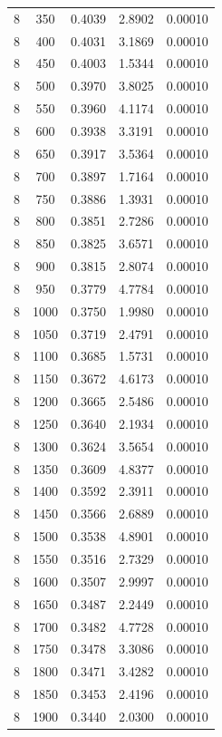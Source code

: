 \begin{longtable}{ccccc}
    8 & 350 & 0.4039 & 2.8902 & 0.00010 \\
    8 & 400 & 0.4031 & 3.1869 & 0.00010 \\
    8 & 450 & 0.4003 & 1.5344 & 0.00010 \\
    8 & 500 & 0.3970 & 3.8025 & 0.00010 \\
    8 & 550 & 0.3960 & 4.1174 & 0.00010 \\
    8 & 600 & 0.3938 & 3.3191 & 0.00010 \\
    8 & 650 & 0.3917 & 3.5364 & 0.00010 \\
    8 & 700 & 0.3897 & 1.7164 & 0.00010 \\
    8 & 750 & 0.3886 & 1.3931 & 0.00010 \\
    8 & 800 & 0.3851 & 2.7286 & 0.00010 \\
    8 & 850 & 0.3825 & 3.6571 & 0.00010 \\
    8 & 900 & 0.3815 & 2.8074 & 0.00010 \\
    8 & 950 & 0.3779 & 4.7784 & 0.00010 \\
    8 & 1000 & 0.3750 & 1.9980 & 0.00010 \\
    8 & 1050 & 0.3719 & 2.4791 & 0.00010 \\
    8 & 1100 & 0.3685 & 1.5731 & 0.00010 \\
    8 & 1150 & 0.3672 & 4.6173 & 0.00010 \\
    8 & 1200 & 0.3665 & 2.5486 & 0.00010 \\
    8 & 1250 & 0.3640 & 2.1934 & 0.00010 \\
    8 & 1300 & 0.3624 & 3.5654 & 0.00010 \\
    8 & 1350 & 0.3609 & 4.8377 & 0.00010 \\
    8 & 1400 & 0.3592 & 2.3911 & 0.00010 \\
    8 & 1450 & 0.3566 & 2.6889 & 0.00010 \\
    8 & 1500 & 0.3538 & 4.8901 & 0.00010 \\
    8 & 1550 & 0.3516 & 2.7329 & 0.00010 \\
    8 & 1600 & 0.3507 & 2.9997 & 0.00010 \\
    8 & 1650 & 0.3487 & 2.2449 & 0.00010 \\
    8 & 1700 & 0.3482 & 4.7728 & 0.00010 \\
    8 & 1750 & 0.3478 & 3.3086 & 0.00010 \\
    8 & 1800 & 0.3471 & 3.4282 & 0.00010 \\
    8 & 1850 & 0.3453 & 2.4196 & 0.00010 \\
    8 & 1900 & 0.3440 & 2.0300 & 0.00010 \\

\end{longtable}
